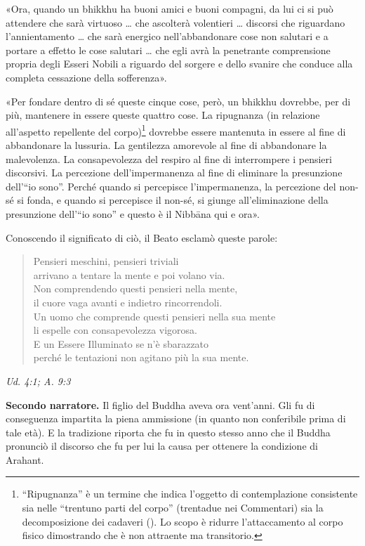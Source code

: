 «Ora, quando un bhikkhu ha buoni amici e buoni compagni, da lui ci si
può attendere che sarà virtuoso … che ascolterà volentieri … discorsi
che riguardano l’annientamento … che sarà energico nell’abbandonare cose
non salutari e a portare a effetto le cose salutari … che egli avrà la
penetrante comprensione propria degli Esseri Nobili a riguardo del
sorgere e dello svanire che conduce alla completa cessazione della
sofferenza».


«Per fondare dentro di sé queste cinque cose, però, un bhikkhu dovrebbe,
per di più, mantenere in essere queste quattro cose. La ripugnanza (in
relazione all’aspetto repellente del corpo)\footnote{“Ripugnanza” è un termine che indica l’oggetto di contemplazione consistente sia nelle “trentuno parti del corpo” (trentadue nei Commentari) sia la decomposizione dei cadaveri (\hyperlink{cap-12-La-Dottrina#pag270}{}). Lo scopo è ridurre l’attaccamento al corpo fisico dimostrando che è non attraente ma transitorio.} dovrebbe
essere mantenuta in essere al fine di abbandonare la lussuria. La
gentilezza amorevole al fine di abbandonare la malevolenza. La
consapevolezza del respiro al fine di interrompere i pensieri
discorsivi. La percezione dell’impermanenza al fine di eliminare la
presunzione dell’“io sono”. Perché quando si percepisce l’impermanenza,
la percezione del non-sé si fonda, e quando si percepisce il non-sé, si
giunge all’eliminazione della presunzione dell’“io sono” e questo è il
Nibbāna qui e ora».


Conoscendo il significato di ciò, il Beato esclamò queste parole:


\begin{quotation}
Pensieri meschini, pensieri triviali \\
arrivano a tentare la mente e poi volano via. \\
Non comprendendo questi pensieri nella mente, \\
il cuore vaga avanti e indietro rincorrendoli. \\
Un uomo che comprende questi pensieri nella sua mente \\
li espelle con consapevolezza vigorosa. \\
E un Essere Illuminato se n’è sbarazzato \\
perché le tentazioni non agitano più la sua mente.
\end{quotation}

\emph{Ud. 4:1; A. 9:3}


\textbf{Secondo narratore.} Il figlio del Buddha aveva ora vent’anni. Gli fu di
conseguenza impartita la piena ammissione (in quanto non conferibile
prima di tale età). E la tradizione riporta che fu in questo stesso anno
che il Buddha pronunciò il discorso che fu per lui la causa per ottenere
la condizione di Arahant.


